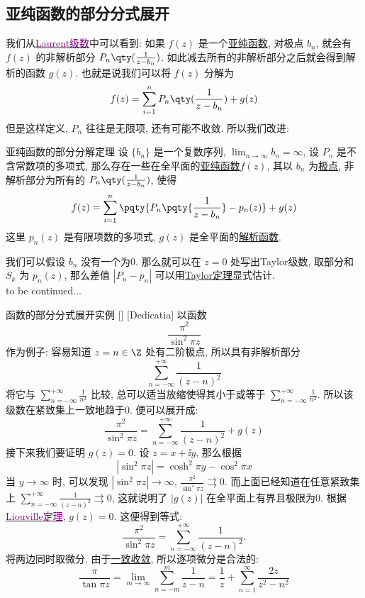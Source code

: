 \documentclass[UTF8]{ctexart}
\newcommand{\hyperrefc}[2]{\hyperref[#1]{\textcolor{purple}{#2}}}
\newcommand{\continued}{{\Large to be continued...}}
\newcommand{\AnalyticalFunction}{\hyperref[dfn:AnalyticalFunction]{解析函数}}
\newcommand{\UniformConvergence}{\hyperref[dfn:UniformConvergence]{一致收敛}}
\newcommand{\MeromorphicFunction}{\hyperref[dfn:MeromorphicFunction]{亚纯函数}}
\newcommand{\TaylorThm}{\hyperref[thm:Taylor]{Taylor定理}}
\begin{document}
\subsection{亚纯函数的部分分式展开}
我们从\hyperrefc{thm:Laurent}{Laurent级数}中可以看到: 如果 \( f(z) \) 是一个\MeromorphicFunction, 对极点 \( b_n \), 就会有 \( f(z) \) 的非解析部分 \( P_n\qty(\frac{1}{z-b_n}) \). 如此减去所有的非解析部分之后就会得到解析的函数 \( g(z) \). 也就是说我们可以将 \( f(z) \) 分解为
\[f(z)=\sum_{i=1}^{n}P_n\qty(\frac{1}{z-b_n})+g(z)\]
但是这样定义,  \( P_n \) 往往是无限项, 还有可能不收敛. 所以我们改进: 
\begin{thm}
    {亚纯函数的部分分解定理}
    设 \( \{b_n\} \) 是一个复数序列,  \( \lim_{n\to\infty }b_n=\infty \), 设 \( P_n \) 是不含常数项的多项式, 那么存在一些在全平面的\MeromorphicFunction  \( f(z) \), 其以 \( b_n \) 为\hyperref[dfn:PolarSingularity]{极点}, 非解析部分为所有的 \( P_n\qty(\frac{1}{z-b_n}) \), 使得
    \[f(z)=\sum_{i=1}^{n}\pqty{P_n\pqty{\frac{1}{z-b_n}}-p_n(z)}+g(z)\]
    这里 \( p_n(z) \) 是有限项数的多项式,  \( g(z) \) 是全平面的\AnalyticalFunction. 
\end{thm}
\begin{prf}
    我们可以假设 \( b_n \) 没有一个为0. 那么就可以在 \( z=0 \) 处写出Taylor级数, 取部分和 \( S_k \) 为 \( p_n(z) \), 那么差值 \( |P_n-p_n| \) 可以用\TaylorThm 显式估计. \\
    \continued
\end{prf}
\begin{xmp}
    [64]
    {函数的部分分式展开实例}
    []
    [Dedicatia]
    以函数
    \[\frac{\pi^2}{\sin^2\pi z}\]
    作为例子: 容易知道 \( z=n\in\Z \) 处有二阶极点, 所以具有非解析部分
    \[\sum_{n=-\infty}^{+\infty}\frac{1}{(z-n)^2}\]
    将它与 \( \sum\limits_{n=-\infty}^{+\infty}\frac{1}{n^2} \) 比较, 总可以适当放缩使得其小于或等于 \( \sum\limits_{n=-\infty}^{+\infty}\frac{1}{n^2} \). 所以该级数在紧致集上一致地趋于0. 便可以展开成: 
    \[\frac{\pi^2}{\sin^2\pi z}=\sum_{n=-\infty}^{+\infty}\frac{1}{(z-n)^2}+g(z)\]
    接下来我们要证明 \( g(z)=0 \). 设 \( z=x+\ii y \), 那么根据
    \[|\sin^2\pi z|=\cosh^2\pi y-\cos^2\pi x\]
    当 \( y\to\infty \) 时, 可以发现 \( |\sin^2\pi z|\to\infty \),  \( \frac{\pi^2}{\sin^2\pi z}\rightrightarrows 0 \). 而上面已经知道在任意紧致集上 \( \sum_{n=-\infty}^{+\infty}\frac{1}{(z-n)^2}\rightrightarrows 0 \), 这就说明了 \( |g(z)| \) 在全平面上有界且极限为0. 根据\hyperrefc{thm:Liouville}{Liouville定理},  \( g(z)=0 \). 这便得到等式: 
    \[\frac{\pi^2}{\sin^2\pi z}=\sum_{n=-\infty}^{+\infty}\frac{1}{(z-n)^2}.\]
    将两边同时取微分. 由于\UniformConvergence, 所以逐项微分是合法的: 
    \[\frac{\pi}{\tan\pi z}=\lim_{m\to\infty}\sum_{n=-m}^{m}\frac{1}{z-n}=\frac{1}{z}+\sum_{n=1}^{\infty}\frac{2z}{z^2-n^2}\]
\end{xmp}
\end{document}
